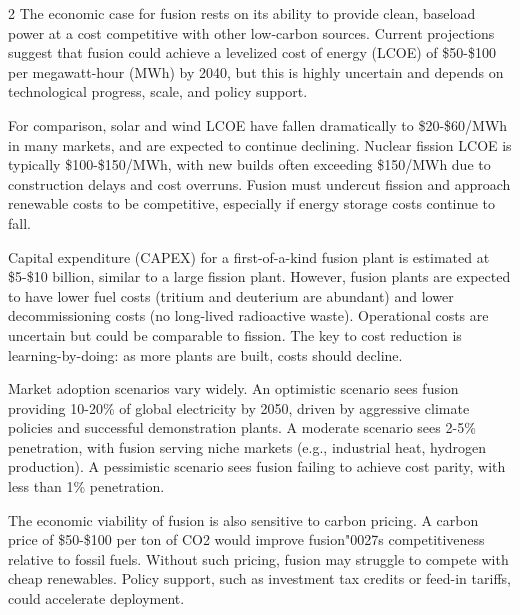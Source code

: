 \documentclass[10pt,a4paper]{article}
\newcommand{\BOApos}{{\BOQuoteFont\char"0027}}
\begin{document}
\begin{multicols}{2}
{\small The economic case for fusion rests on its ability to provide clean, baseload power at a cost competitive with other low-carbon sources. Current projections suggest that fusion could achieve a levelized cost of energy (LCOE) of \$50-\$100 per megawatt-hour (MWh) by 2040, but this is highly uncertain and depends on technological progress, scale, and policy support.}\par
{\small For comparison, solar and wind LCOE have fallen dramatically to \$20-\$60/MWh in many markets, and are expected to continue declining. Nuclear fission LCOE is typically \$100-\$150/MWh, with new builds often exceeding \$150/MWh due to construction delays and cost overruns. Fusion must undercut fission and approach renewable costs to be competitive, especially if energy storage costs continue to fall.}\par
{\small Capital expenditure (CAPEX) for a first-of-a-kind fusion plant is estimated at \$5-\$10 billion, similar to a large fission plant. However, fusion plants are expected to have lower fuel costs (tritium and deuterium are abundant) and lower decommissioning costs (no long-lived radioactive waste). Operational costs are uncertain but could be comparable to fission. The key to cost reduction is learning-by-doing: as more plants are built, costs should decline.}\par
{\small Market adoption scenarios vary widely. An optimistic scenario sees fusion providing 10-20\% of global electricity by 2050, driven by aggressive climate policies and successful demonstration plants. A moderate scenario sees 2-5\% penetration, with fusion serving niche markets (e.g., industrial heat, hydrogen production). A pessimistic scenario sees fusion failing to achieve cost parity, with less than 1\% penetration.}\par
{\small The economic viability of fusion is also sensitive to carbon pricing. A carbon price of \$50-\$100 per ton of CO2 would improve fusion\BOApos{}s competitiveness relative to fossil fuels. Without such pricing, fusion may struggle to compete with cheap renewables. Policy support, such as investment tax credits or feed-in tariffs, could accelerate deployment.}\par
\end{multicols}
\label{chap:3:end}
\end{document}
